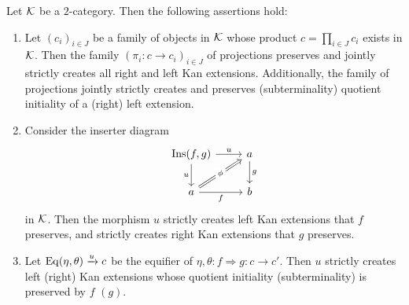 \begin{theorem}\label{thm:pie_kan_creation}
   Let $\mathcal{K}$ be a $2$-category. Then the following assertions hold:
   \begin{enumerate}
       \item Let $(c_i)_{i \in J}$ be a family of objects in $\mathcal{K}$ whose product $c = \prod_{i\in J} c_i$ exists in $\mathcal{K}$. Then the family $(\pi_i \colon c \to c_i)_{i\in J}$ of projections preserves and jointly strictly creates all right and left Kan extensions. Additionally, the family of projections jointly strictly creates and preserves (subterminality) quotient initiality of a (right) left extension.
       \item Consider the inserter diagram
       \[
\begin{tikzcd}
{\Ins(f,g)} \arrow[d, "u"'] \arrow[r, "u"]        & a \arrow[d, "g"] \\
a \arrow[r, "f"'] \arrow[ru, "\phi" description, Rightarrow] & b
\end{tikzcd}
\]
       in $\mathcal{K}$. Then the morphism $u$ strictly creates left Kan extensions that $f$ preserves, and strictly creates right Kan extensions that $g$ preserves.
       \item Let $\mathrm{Eq}(\eta,\theta)\xrightarrow{u}c$ be the equifier of $\eta,\theta \colon f \Rightarrow g \colon c \to c'$. Then $u$ strictly creates left (right) Kan extensions whose quotient initiality (subterminality) is preserved by $f$ $(g)$.
   \end{enumerate}
\end{theorem}
